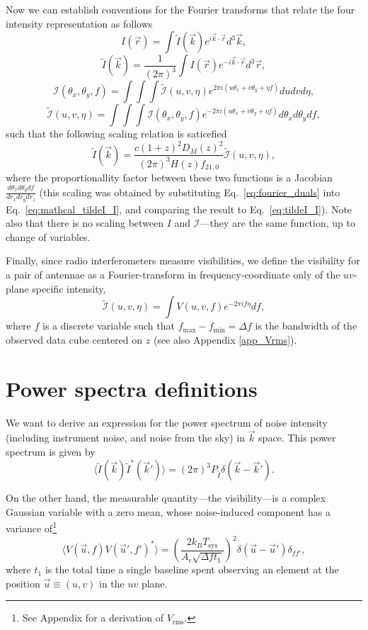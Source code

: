 \documentclass[12pt]{paper}
\newcommand{\beq}{\begin{equation}}
\newcommand{\eeq}{\end{equation}}
\begin{document}
Now we can establish conventions for the Fourier transforms that relate the four intensity representation as follows
\beq
I(\vec{r}) = \int\widetilde{I}(\vec{k})e^{i\vec{k} \cdot \vec{r}}d^3\vec{k},
\label{eq:I_tildeI}
\eeq
\beq
\widetilde{I}(\vec{k}) = \frac{1}{(2\pi)^3}\int{I}(\vec{r})e^{-i\vec{k} \cdot \vec{r}}d^3\vec{r},
\label{eq:tildeI_I}
\eeq
\beq
\mathcal{I}(\theta_x,\theta_y,f) = \int\int\int\widetilde{\mathcal{I}}(u,v,\eta)e^{2\pi i(u\theta_x + v\theta_y+\eta f)}dudvd\eta,
\label{eq:mathcal_I_tildeI}
\eeq
\beq
\widetilde{\mathcal{I}}(u,v,\eta) = \int\int\int{\mathcal{I}}(\theta_x,\theta_y,f)e^{-2\pi i(u\theta_x + v\theta_y+\eta f)}d\theta_xd\theta_ydf,
\label{eq:mathcal_tildeI_I}
\eeq
such that the following scaling relation is saticefied
\begin{equation}
\widetilde{I}(\vec{k}) = \frac{c(1+z)^2D_M(z)^2}{(2\pi)^3H(z)f_{21,0}}\widetilde{\mathcal{I}}(u,v,\eta),
\label{eq_tilde_I_vs_Ik_scaling}
\end{equation}
where the proportionallity factor between these two functions is a Jacobian $\frac{d\theta_xd\theta_ydf}{dr_xdr_ydr_z}$ (this scaling was obtained by substituting Eq.~\ref{eq:fourier_duals} into Eq.~\ref{eq:mathcal_tildeI_I}, and comparing the result to Eq.~\ref{eq:tildeI_I}). Note also that there is no scaling between $I$ and $\mathcal{I}$---they are the same function, up to change of variables.

Finally, since radio interferometers measure visibilities, we define the visibility for a pair of antennae as a Fourier-transform in frequency-coordinate only of the $uv$-plane specific intensity,
\beq
\mathcal{\widetilde{I}}(u,v,\eta) = \int V(u,v,f)e^{-2\pi i f\eta}df,
\label{eq:visibility}
\eeq
where $f$ is a discrete variable such that $f_\text{max}-f_\text{min}=\Delta f$ is the bandwidth of the observed data cube centered on $z$ (see also Appendix \ref{app_Vrms}).
\section{Power spectra definitions}

We want to derive an expression for the power spectrum of noise intensity (including instrument noise, and noise from the sky) in $\vec{k}$ space. This power spectrum is given by
\beq
\langle \widetilde{I}(\vec{k})\widetilde{I}^*(\vec{k}')\rangle = (2\pi)^3P_{\widetilde{I}}\delta(\vec{k}-\vec{k}').
\label{eq_tildeI_power}
\eeq

On the other hand, the measurable quantity---the visibility---is a complex Gaussian variable with a zero mean, whose noise-induced component has a variance of\footnote{See Appendix for a derivation of $V_\text{rms}$.}
\beq
\langle V(\vec{u},f)V(\vec{u}',f')^*\rangle = \left(\frac{2k_BT_\text{sys}}{A_e\sqrt{\Delta f t_1}}\right)^2 \delta(\vec{u}-\vec{u}')\delta_{ff'},
\label{eq_Vrms}
\eeq 
where $t_1$ is the total time a single baseline spent observing an element at the position $\vec u \equiv(u,v)$ in the $uv$ plane. 
\end{document}
